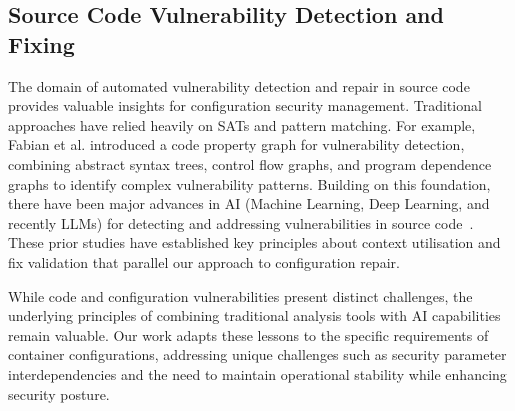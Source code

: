 \subsection{Source Code Vulnerability Detection and Fixing}
The domain of automated vulnerability detection and repair in source code provides valuable insights for configuration security management. Traditional approaches have relied heavily on SATs and pattern matching. For example, Fabian et al.\cite{yamaguchi2014modeling} introduced a code property graph for vulnerability detection, combining abstract syntax trees, control flow graphs, and program dependence graphs to identify complex vulnerability patterns.
Building on this foundation, there have been major advances in AI (Machine Learning, Deep Learning, and recently LLMs) for detecting and addressing vulnerabilities in source code~\cite{Harer2018AutomatedSV,le2021deepcva,chakraborty2021deep,le2022survey,le2022towards,fu2022linevul,le2022use,fu2022vulrepair,nguyen2024automated,le2024software}. These prior studies have established key principles about context utilisation and fix validation that parallel our approach to configuration repair.

While code and configuration vulnerabilities present distinct challenges, the underlying principles of combining traditional analysis tools with AI capabilities remain valuable. Our work adapts these lessons to the specific requirements of container configurations, addressing unique challenges such as security parameter interdependencies and the need to maintain operational stability while enhancing security posture.